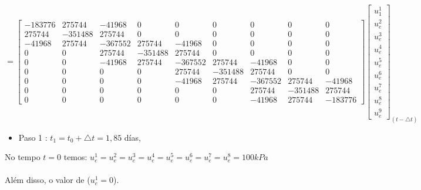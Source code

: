 \documentclass{article} %
\begin{document}
\begin{equation*}
=\begin{bmatrix}
-183776&275744&-41968&0&0&0&0&0&0\\
275744&-351488&275744& 0& 0& 0& 0& 0& 0\\
-41968&275744&-367552&275744&-41968& 0& 0& 0& 0\\
0&0&275744&-351488&275744& 0& 0& 0& 0\\
0&0&-41968&275744&-367552&275744&-41968& 0& 0\\
0&0&0&0&275744&-351488&275744& 0& 0\\
0&0&0&0&-41968&275744&-367552&275744&-41968\\
0&0&0&0&0&0&275744&-351488&275744\\
0&0&0&0&0&0&-41968&275744&-183776
\end{bmatrix}\begin{bmatrix}
u_1^1\\
u_e^2\\
u_e^3\\
u_e^4\\
u_e^5\\
u_e^6\\
u_e^7\\
u_e^8\\
u_e^9
\end{bmatrix}_{(t-\triangle t)}
\end{equation*}
\begin{itemize}
	\item Paso 1 : \(t_1=t_0+\triangle t=1,85\) días,
\end{itemize}

No tempo \(t=0\) temos: \(u_e^1=u_e^2=u_e^3=u_e^4=u_e^5=u_e^6=u_e^7=u_e^8=100kPa\)\\
\\
\indent Além disso, o valor de (\(u_e^1=0\)).\\
\end{document}
